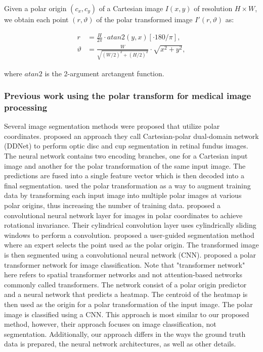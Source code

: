 Given a polar origin $(c_x, c_y)$ of a Cartesian image $I(x, y)$ of resolution $H \times W$, we obtain each point $(r, \vartheta)$ of the polar transformed image $I'(r, \vartheta)$ as:

  \begin{equation}
    \begin{aligned}
      r &= \frac{H}{2 \pi} \cdot atan2(y, x) [ \cdot 180 / \pi ], \\
      \vartheta &= \frac{W}{\sqrt{(W / 2)^2 + (H / 2)^2}} \cdot \sqrt{x^2 + y^2},
    \end{aligned}
    \label{eq:polar-transform}
  \end{equation}
  
  where $atan2$ is the 2-argument arctangent function.

    \subsubsection{Previous work using the polar transform for medical image processing}
    
Several image segmentation methods were proposed that utilize polar coordinates. 
\citet{liuDDNetCartesianpolarDualdomain2019a} proposed an approach they
call Cartesian-polar dual-domain network (DDNet) to perform optic disc and cup segmentation
in retinal fundus images. The neural network contains two encoding branches, one for a Cartesian input image and another for the polar transformation of the same input image. The predictions are fused into a single feature vector which is then decoded into a final segmentation.
\citet{salehinejadImageAugmentationUsing2018} used the polar transformation as a way to 
augment
training data by transforming each input image into multiple polar images at various polar
origins, thus increasing the number of training data.
\citet{kimCyCNNRotationInvariant2020a} proposed a convolutional neural network layer for 
images in polar 
coordinates to achieve rotational invariance. Their cylindrical convolution layer uses cylindrically sliding windows to perform a convolution.
\citet{kimCNNBasedUGS2018} proposed a user-guided segmentation method where an expert 
selects the
point used as the polar origin. The transformed image is then
segmented using a convolutional neural network (CNN). 
\citet{estevesPolarTransformerNetworks2018a} proposed a polar transformer network for image 
classification. Note that "transformer network" here refers to spatial transformer networks 
\cite{jaderbergSpatialTransformerNetworks2016} and not attention-based networks commonly called 
transformers.
The network 
consist of a polar origin predictor and a neural network that predicts a heatmap. The centroid of the heatmap is then used as the origin for a polar transformation of the input image. The polar image is classified using a CNN. This approach is most similar to our proposed method, 
however, their approach focuses on image classification, not segmentation. Additionally, our approach differs in the ways the ground truth data is prepared, the neural network architectures, as well as other details.

